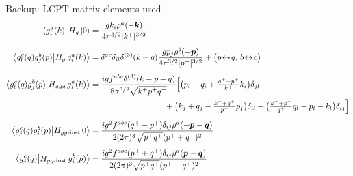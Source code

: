 \documentclass[9pt,aspectratio=169]{beamer}
\newcommand{\pp}{p^{+}}
\newcommand{\kp}{k^{+}}
\newcommand{\ket}[1]{\left|#1\right\rangle}
\newcommand{\bra}[1]{\left\langle#1\right|}
\newcommand{\bk}[2]{\left\langle#1\middle|#2\right\rangle}
\newcommand{\Hg}{H_{g}}
\newcommand{\Hggg}{H_{ggg}}
\begin{document}
\begin{frame}{Backup: LCPT matrix elements used}
\small
\begin{align*}
\bra{g^{a}_{i}(k)}\Hg\ket{0}&=\frac{g k_{i}\rho^{a}(-\bm k)}{4\pi^{3/2}|\kp|^{3/2}}\\[4pt]
\bk{g^{c}_{l}(q)g^{b}_{j}(p)}{\Hg\,g^{a}_{i}(k)}&=
\delta^{ac}\delta_{il}\delta^{(3)}(k-q)\frac{g p_{j}\rho^{b}(-\bm p)}{4\pi^{3/2}|\pp|^{3/2}}
+\big(p\!\leftrightarrow\!q,\,b\!\leftrightarrow\!c\big)\\[4pt]
\bk{g^{c}_{l}(q)g^{b}_{j}(p)}{\Hggg\, g^{a}_{i}(k)}&=
\frac{igf^{abc}\delta^{(3)}(k-p-q)}{8\pi^{3/2}\sqrt{\kp\pp q^{+}}}\Big[
\big(p_{i}-q_{i}+\tfrac{q^{+}-\pp}{\kp}k_{i}\big)\delta_{jl}\\
&\hspace{3.2cm}+\big(k_{j}+q_{j}-\tfrac{\kp+q^{+}}{\pp}p_{j}\big)\delta_{il}
+\big(\tfrac{\kp+\pp}{q^{+}}q_{l}-p_{l}-k_{l}\big)\delta_{ij}\Big]\\[4pt]
\bk{g^{c}_{j}(q)g^{b}_{i}(p)}{H_{gg\text{-inst}}\,0}&=
\frac{ig^{2}f^{abc}(q^{+}-\pp)\delta_{ij}\rho^{a}(-\bm p-\bm q)}{2(2\pi)^{3}\sqrt{\pp q^{+}}(\pp+q^{+})^{2}}\\[4pt]
\bk{g^{c}_{j}(q)}{H_{gg\text{-inst}}\,g^{b}_{i}(p)}&=
\frac{ig^{2}f^{abc}(\pp+q^{+})\delta_{ij}\rho^{a}(\bm p-\bm q)}{2(2\pi)^{3}\sqrt{\pp q^{+}}(\pp-q^{+})^{2}}
\end{align*}
\end{frame}
\end{document}
